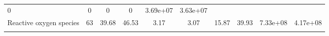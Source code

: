 \documentclass[]{article}
\begin{document}
\begin{longtable}[]{@{}lccccccccc@{}}
\begin{minipage}[t]{0.08\columnwidth}
0\strut
\end{minipage} & \begin{minipage}[t]{0.08\columnwidth}\centering\strut
0\strut
\end{minipage} & \begin{minipage}[t]{0.08\columnwidth}\centering\strut
0\strut
\end{minipage} & \begin{minipage}[t]{0.08\columnwidth}\centering\strut
0\strut
\end{minipage} & \begin{minipage}[t]{0.08\columnwidth}\centering\strut
3.69e+07\strut
\end{minipage} & \begin{minipage}[t]{0.08\columnwidth}\centering\strut
3.63e+07\strut
\end{minipage}\tabularnewline
\begin{minipage}[t]{0.07\columnwidth}\raggedright\strut
Reactive oxygen species\strut
\end{minipage} & \begin{minipage}[t]{0.06\columnwidth}\centering\strut
63\strut
\end{minipage} & \begin{minipage}[t]{0.08\columnwidth}\centering\strut
39.68\strut
\end{minipage} & \begin{minipage}[t]{0.08\columnwidth}\centering\strut
46.53\strut
\end{minipage} & \begin{minipage}[t]{0.08\columnwidth}\centering\strut
3.17\strut
\end{minipage} & \begin{minipage}[t]{0.08\columnwidth}\centering\strut
3.07\strut
\end{minipage} & \begin{minipage}[t]{0.08\columnwidth}\centering\strut
15.87\strut
\end{minipage} & \begin{minipage}[t]{0.08\columnwidth}\centering\strut
39.93\strut
\end{minipage} & \begin{minipage}[t]{0.08\columnwidth}\centering\strut
7.33e+08\strut
\end{minipage} & \begin{minipage}[t]{0.08\columnwidth}\centering\strut
4.17e+08\strut
\end{minipage}\tabularnewline
\begin{minipage}[t]{0.07\columnwidth}\raggedright\strut

\end{minipage}
\end{longtable}
\end{document}
